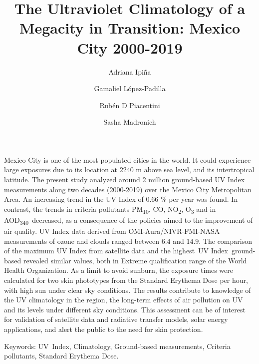 \documentclass{article}
\renewenvironment{abstract}
  {{\bfseries\noindent{\abstractname}\par\nobreak}\footnotesize}
  {\bigskip}
\begin{document}
\title{The Ultraviolet Climatology of a Megacity in Transition: Mexico City 2000-2019}
\author[1]{Adriana Ipiña}%
\author[2]{Gamaliel López-Padilla}%
\author[1]{Rubén D Piacentini}%
\author[3]{Sasha Madronich}
%
\vspace{-1em}
\date{}
\begingroup
\let\center\flushleft
\let\endcenter\endflushleft
\maketitle
\endgroup
\linenumbers
{}
\begin{abstract}
  Mexico City is one of the most populated cities in the world. It could
  experience large exposures due to its location at 2240 m above sea
  level, and its intertropical latitude. The present study analyzed around
  2 million ground-based UV Index measurements along two decades
  (2000-2019) over the Mexico City Metropolitan Area. An increasing trend
  in the UV Index of 0.66 \% per year was found. In contrast, the trends
  in criteria pollutants PM\textsubscript{10}, CO, NO\textsubscript{2},
  O\textsubscript{3} and in AOD\textsubscript{340}~decreased, as a
  consequence of the policies aimed to the improvement of air quality. UV
  Index data derived from OMI-Aura/NIVR-FMI-NASA measurements of ozone and
  clouds ranged between 6.4 and 14.9. The comparison of the maximum UV
  Index from satellite data and the highest~UV Index~ground-based revealed
  similar values, both in Extreme qualification range of the World Health
  Organization. As a limit to avoid sunburn, the exposure times were
  calculated for two skin phototypes from the Standard Erythema Dose per
  hour, with high sun under clear sky conditions. The results contribute
  to knowledge of the UV climatology in the region, the long-term effects
  of air pollution on UV and its levels under different sky conditions.
  This assessment can be of interest for validation of satellite data and
  radiative transfer models, solar energy applications, and alert the
  public to the need for skin protection.%
  \end{abstract}%



Keywords: UV~Index, Climatology, Ground-based measurements, Criteria
pollutants, Standard Erythema Dose.~~
\end{document}
